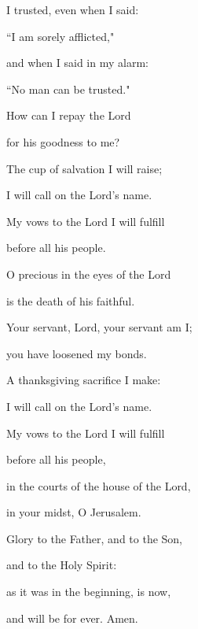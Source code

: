 \noindent I trusted, even when I said:~\GreStar{}~\nopagebreak

``I am sorely afflicted,"

\noindent and when I said in my alarm:~\GreStar{}~\nopagebreak

``No man can be trusted."

\noindent How can I repay the Lord~\GreStar{}~\nopagebreak

for his goodness to me?

\noindent The cup of salvation I will raise;~\GreStar{}~\nopagebreak

I will call on the Lord’s name.

\noindent My vows to the Lord I will fulfill~\GreStar{}~\nopagebreak

before all his people.

\noindent O precious in the eyes of the Lord~\GreStar{}~\nopagebreak

is the death of his faithful.

\noindent Your servant, Lord, your servant am I;~\GreStar{}~\nopagebreak

you have loosened my bonds.

\noindent A thanksgiving sacrifice I make:~\GreStar{}~\nopagebreak

I will call on the Lord’s name.

\noindent My vows to the Lord I will fulfill~\GreStar{}~\nopagebreak

before all his people,

\noindent in the courts of the house of the Lord,~\GreStar{}~\nopagebreak

in your midst, O Jerusalem.

\noindent Glory to the Father, and to the Son,~\GreStar{}~\nopagebreak

and to the Holy Spirit:

\noindent as it was in the beginning, is now,~\GreStar{}~\nopagebreak

and will be for ever. Amen.
